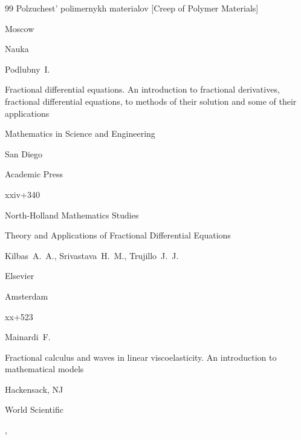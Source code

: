 \documentclass[11pt,a4paper,twoside]{article}
\begin{document}
\begin{thebibliography}{99}
\book Polzuchest' polimernykh materialov \rm [Creep of Polymer Materials]


\publaddr Moscow


\publ Nauka











\by Podlubny~I.


\book Fractional differential equations. An introduction to fractional derivatives, fractional differential equations, to methods of their solution and some of their applications




\serial Mathematics in Science and Engineering




\publaddr San Diego


\publ Academic Press




\totalpages xxiv+340










\serial North-Holland Mathematics Studies






\book Theory and Applications of Fractional Differential Equations


\by Kilbas~A.~A., Srivastava~H.~M., Trujillo~J.~J.


\publ Elsevier


\publaddr Amsterdam


\totalpages xx+523












\by Mainardi~F.


\book Fractional calculus and waves in linear viscoelasticity. An introduction to mathematical models


\publaddr Hackensack, NJ


\publ World Scientific


,



\end{thebibliography}
\end{document}
